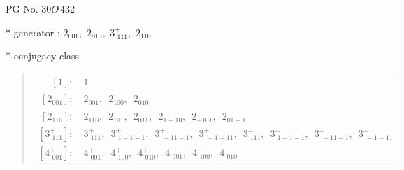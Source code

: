 \documentclass[fleqn,8pt]{jsarticle}
\begin{document}
\setcounter{MaxMatrixCols}{32}

\renewcommand{\tablename}{Table~}
\renewcommand{\figurename}{Figure~}
\begin{center}
\LARGE
PG No. 30\quad$O_{\rm }$\quad$432$\quad[ cubic ]
\end{center}

* generator : $2{}_{001},\,\,2{}_{010},\,\,3^{+}_{\,\,111},\,\,2{}_{110}$

* conjugacy class
\begin{quote}
\begin{tabular}{rl}
$ [1]: $ & $ 1 $ \\
$ [2{}_{001}]: $ & $ 2{}_{001},\,\,\,2{}_{100},\,\,\,2{}_{010} $ \\
$ [2{}_{110}]: $ & $ 2{}_{110},\,\,\,2{}_{101},\,\,\,2{}_{011},\,\,\,2{}_{1-10},\,\,\,2{}_{-101},\,\,\,2{}_{01-1} $ \\
$ [3^{+}_{\,\,111}]: $ & $ 3^{+}_{\,\,111},\,\,\,3^{+}_{\,\,1-1-1},\,\,\,3^{+}_{\,\,-11-1},\,\,\,3^{+}_{\,\,-1-11},\,\,\,3^{-}_{\,\,111},\,\,\,3^{-}_{\,\,1-1-1},\,\,\,3^{-}_{\,\,-11-1},\,\,\,3^{-}_{\,\,-1-11} $ \\
$ [4^{+}_{\,\,001}]: $ & $ 4^{+}_{\,\,001},\,\,\,4^{+}_{\,\,100},\,\,\,4^{+}_{\,\,010},\,\,\,4^{-}_{\,\,001},\,\,\,4^{-}_{\,\,100},\,\,\,4^{-}_{\,\,010} $
\end{tabular}
\end{quote}
\end{document}
